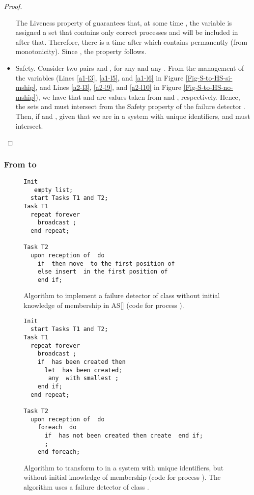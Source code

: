 \documentclass[10pt, conference, compsocconf]{IEEEtran}
\begin{document}
\begin{proof}
\begin{itemize}
The Liveness property of  guarantees that, at some time , the variable  is assigned  a set   that contains only correct processes and  will be included in  after that. Therefore, there is a time after which  contains  permanently (from monotonicity).  Since , the property follows.
 
\item Safety.
Consider two pairs  and , for any  and any . From the management of the  variables (Lines \ref{a1-l3}, \ref{a1-l5}, and \ref{a1-l6} in Figure \ref{Fig-S-to-HS-si-mship}, and Lines \ref{a2-l3}, \ref{a2-l9}, and \ref{a2-l10} in Figure \ref{Fig-S-to-HS-no-mship}), we have that  and  are values taken from  and , respectively. Hence, the sets  and  must intersect from the Safety property of the  failure detector . Then, if  and  , given that we are in a system with unique identifiers,  and  must intersect.
\end{itemize}
\end{proof}

\subsubsection{From  to }

\begin{figure}
\begin{lstlisting}
Init
   empty list;
  start Tasks T1 and T2;
Task T1
  repeat forever
    broadcast ;
  end repeat;

Task T2	
  upon reception of  do
    if  then move  to the first position of 
    else insert  in the first position of 
    end if;
\end{lstlisting}		
\caption{Algorithm to implement a failure detector of class  without initial knowledge of membership in AS[] (code for process ).}
\label{Fig-Xi}
\end{figure}

\begin{figure*}
\begin{lstlisting}
Init
  start Tasks T1 and T2;
Task T1
  repeat forever
    broadcast ;
    if  has been created then
      let  has been created;
       any  with smallest ;
    end if;
  end repeat;

Task T2	
  upon reception of  do
    foreach  do 
      if  has not been created then create  end if;
      ;
    end foreach;
\end{lstlisting}		
\caption{Algorithm to transform  to  in a system with unique identifiers, but without initial knowledge of membership (code for process ). The algorithm uses a failure detector  of class .}
\label{Fig-HS-to-S-no-mship}
\end{figure*}
\end{document}
